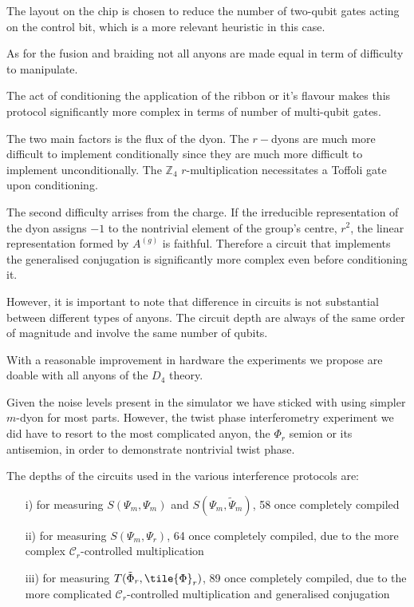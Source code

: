 \documentclass[two column]{article}
\begin{document}
The layout on the chip is chosen to reduce the number of two-qubit gates acting on the control bit, which is a more relevant heuristic in this case.

As for the fusion and braiding not all anyons are made equal in term of difficulty to manipulate.

The act of conditioning the application of the ribbon or it's flavour makes this protocol significantly more complex in terms of number of multi-qubit gates.

The two main factors is the flux of the dyon. The $r-$dyons are much more difficult to implement conditionally since they are much more difficult to implement unconditionally. The $\mathbb{Z}_4$ $r$-multiplication necessitates a Toffoli gate upon conditioning.

The second difficulty arrises from the charge. If the irreducible representation of the dyon assigns $-1$ to the nontrivial element of the group's centre, $r^2$, the linear representation formed by $A^{(g)}$ is faithful. Therefore a circuit that implements the generalised conjugation is significantly more complex even before conditioning it.

However, it is important to note that difference in circuits is not  substantial between different types of anyons. The circuit depth are always of the same order of magnitude and involve the same number of qubits. 

With a reasonable improvement in hardware the experiments we propose are doable with all anyons of the $D_4$ theory. 

Given the noise levels present in the simulator we have sticked with using simpler $m$-dyon for most parts. However, the twist phase interferometry experiment we did have to resort to the most complicated anyon, the $\Phi_r$ semion or its antisemion, in order to demonstrate nontrivial twist phase.

The depths of the circuits used in the various interference protocols are:\begin{itemize}
	\item[i)] for measuring $S(\Psi_m, \Psi_m)$ and $S(\Psi_m, \tilde{\Psi}_m)$, 58 once completely compiled
	\item[ii)] for measuring $S(\Psi_m, \Psi_r)$, 64 once completely compiled, due to the more complex $\mathcal{C}_r$-controlled multiplication
	\item[iii)] for measuring $T(\tilde{\Phi}_r, \tile{\Phi}_r)$, 89 once completely compiled, due to the more complicated $\mathcal{C}_r$-controlled multiplication and generalised conjugation 
\end{itemize}
\end{document}
